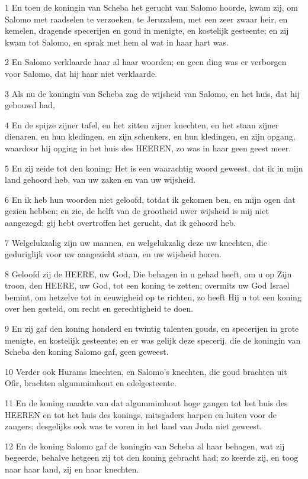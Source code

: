 \par 1 En toen de koningin van Scheba het gerucht van Salomo hoorde, kwam zij, om Salomo met raadselen te verzoeken, te Jeruzalem, met een zeer zwaar heir, en kemelen, dragende specerijen en goud in menigte, en kostelijk gesteente; en zij kwam tot Salomo, en sprak met hem al wat in haar hart was.
\par 2 En Salomo verklaarde haar al haar woorden; en geen ding was er verborgen voor Salomo, dat hij haar niet verklaarde.
\par 3 Als nu de koningin van Scheba zag de wijsheid van Salomo, en het huis, dat hij gebouwd had,
\par 4 En de spijze zijner tafel, en het zitten zijner knechten, en het staan zijner dienaren, en hun kledingen, en zijn schenkers, en hun kledingen, en zijn opgang, waardoor hij opging in het huis des HEEREN, zo was in haar geen geest meer.
\par 5 En zij zeide tot den koning: Het is een waarachtig woord geweest, dat ik in mijn land gehoord heb, van uw zaken en van uw wijsheid.
\par 6 En ik heb hun woorden niet geloofd, totdat ik gekomen ben, en mijn ogen dat gezien hebben; en zie, de helft van de grootheid uwer wijsheid is mij niet aangezegd; gij hebt overtroffen het gerucht, dat ik gehoord heb.
\par 7 Welgelukzalig zijn uw mannen, en welgelukzalig deze uw knechten, die geduriglijk voor uw aangezicht staan, en uw wijsheid horen.
\par 8 Geloofd zij de HEERE, uw God, Die behagen in u gehad heeft, om u op Zijn troon, den HEERE, uw God, tot een koning te zetten; overmits uw God Israel bemint, om hetzelve tot in eeuwigheid op te richten, zo heeft Hij u tot een koning over hen gesteld, om recht en gerechtigheid te doen.
\par 9 En zij gaf den koning honderd en twintig talenten gouds, en specerijen in grote menigte, en kostelijk gesteente; en er was gelijk deze specerij, die de koningin van Scheba den koning Salomo gaf, geen geweest.
\par 10 Verder ook Hurams knechten, en Salomo's knechten, die goud brachten uit Ofir, brachten algummimhout en edelgesteente.
\par 11 En de koning maakte van dat algummimhout hoge gangen tot het huis des HEEREN en tot het huis des konings, mitsgaders harpen en luiten voor de zangers; desgelijks ook was te voren in het land van Juda niet geweest.
\par 12 En de koning Salomo gaf de koningin van Scheba al haar behagen, wat zij begeerde, behalve hetgeen zij tot den koning gebracht had; zo keerde zij, en toog naar haar land, zij en haar knechten.
